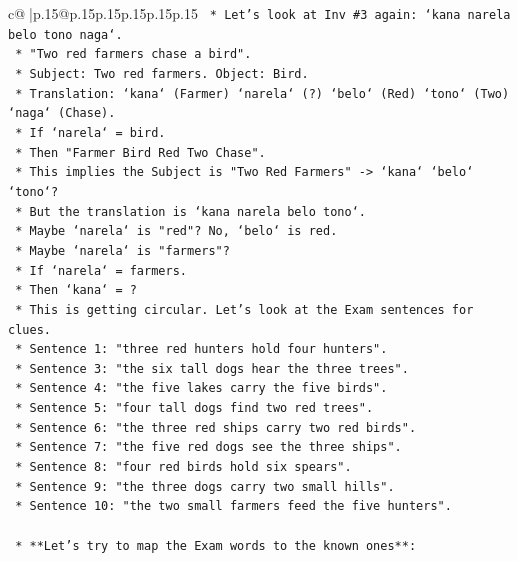 \documentclass{article}
\begin{document}
{\begin{supertabular}{c@{$\;$}|p{.15\linewidth}@{}p{.15\linewidth}p{.15\linewidth}p{.15\linewidth}p{.15\linewidth}p{.15\linewidth}}
{{{\texttt{            *   Let's look at Inv \#3 again: `kana narela belo tono naga`.} \\
\texttt{            *   "Two red farmers chase a bird".} \\
\texttt{            *   Subject: Two red farmers. Object: Bird.} \\
\texttt{            *   Translation: `kana` (Farmer) `narela` (?) `belo` (Red) `tono` (Two) `naga` (Chase).} \\
\texttt{            *   If `narela` = bird.} \\
\texttt{            *   Then "Farmer Bird Red Two Chase".} \\
\texttt{            *   This implies the Subject is "Two Red Farmers" {-}> `kana` `belo` `tono`?} \\
\texttt{            *   But the translation is `kana narela belo tono`.} \\
\texttt{            *   Maybe `narela` is "red"? No, `belo` is red.} \\
\texttt{            *   Maybe `narela` is "farmers"?} \\
\texttt{            *   If `narela` = farmers.} \\
\texttt{            *   Then `kana` = ?} \\
\texttt{            *   This is getting circular. Let's look at the Exam sentences for clues.} \\
\texttt{            *   Sentence 1: "three red hunters hold four hunters".} \\
\texttt{            *   Sentence 3: "the six tall dogs hear the three trees".} \\
\texttt{            *   Sentence 4: "the five lakes carry the five birds".} \\
\texttt{            *   Sentence 5: "four tall dogs find two red trees".} \\
\texttt{            *   Sentence 6: "the three red ships carry two red birds".} \\
\texttt{            *   Sentence 7: "the five red dogs see the three ships".} \\
\texttt{            *   Sentence 8: "four red birds hold six spears".} \\
\texttt{            *   Sentence 9: "the three dogs carry two small hills".} \\
\texttt{            *   Sentence 10: "the two small farmers feed the five hunters".} \\
\\ 
\texttt{    *   **Let's try to map the Exam words to the known ones**:} \\
}}}
\end{supertabular}}
\end{document}

